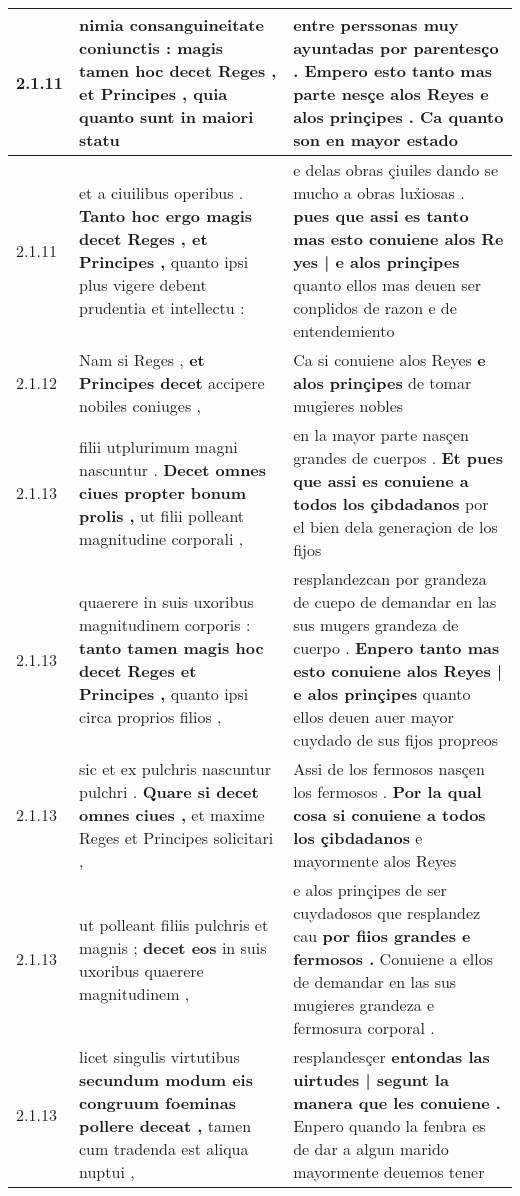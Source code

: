 \begin{tabular}{|p{1cm}|p{6.5cm}|p{6.5cm}|}
2.1.11 & nimia consanguineitate coniunctis : \textbf{ magis tamen hoc decet Reges , et Principes , } quia quanto sunt in maiori statu & entre perssonas muy ayuntadas por parentesço . \textbf{ Empero esto tanto mas parte nesçe alos Reyes e alos prinçipes . } Ca quanto son en mayor estado \\\hline
2.1.11 & et a ciuilibus operibus . \textbf{ Tanto hoc ergo magis decet Reges , et Principes , } quanto ipsi plus vigere debent prudentia et intellectu : & e delas obras çiuiles dando se mucho a obras lux̉iosas . \textbf{ pues que assi es tanto mas esto conuiene alos Re yes | e alos prinçipes } quanto ellos mas deuen ser conplidos de razon e de entendemiento \\\hline
2.1.12 & Nam si Reges , \textbf{ et Principes decet } accipere nobiles coniuges , & Ca si conuiene alos Reyes \textbf{ e alos prinçipes } de tomar mugieres nobles \\\hline
2.1.13 & filii utplurimum magni nascuntur . \textbf{ Decet omnes ciues propter bonum prolis , } ut filii polleant magnitudine corporali , & en la mayor parte nasçen grandes de cuerpos . \textbf{ Et pues que assi es conuiene a todos los çibdadanos } por el bien dela generaçion de los fijos \\\hline
2.1.13 & quaerere in suis uxoribus magnitudinem corporis : \textbf{ tanto tamen magis hoc decet Reges et Principes , } quanto ipsi circa proprios filios , & resplandezcan por grandeza de cuepo de demandar en las sus mugers grandeza de cuerpo . \textbf{ Enpero tanto mas esto conuiene alos Reyes | e alos prinçipes } quanto ellos deuen auer mayor cuydado de sus fijos propreos \\\hline
2.1.13 & sic et ex pulchris nascuntur pulchri . \textbf{ Quare si decet omnes ciues , } et maxime Reges et Principes solicitari , & Assi de los fermosos nasçen los fermosos . \textbf{ Por la qual cosa si conuiene a todos los çibdadanos } e mayormente alos Reyes \\\hline
2.1.13 & ut polleant filiis pulchris et magnis ; \textbf{ decet eos } in suis uxoribus quaerere magnitudinem , & e alos prinçipes de ser cuydadosos que resplandez cau \textbf{ por fiios grandes e fermosos . } Conuiene a ellos de demandar en las sus mugieres grandeza e fermosura corporal . \\\hline
2.1.13 & licet singulis virtutibus \textbf{ secundum modum eis congruum foeminas pollere deceat , } tamen cum tradenda est aliqua nuptui , & resplandesçer \textbf{ entondas las uirtudes | segunt la manera que les conuiene . } Enpero quando la fenbra es de dar a algun marido mayormente deuemos tener \\\hline

\end{tabular}
